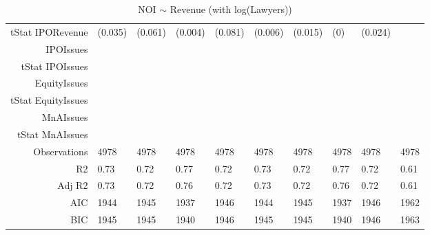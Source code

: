 \begin{table}[ht]
\begin{tabular}{rlllllllll}
  tStat IPORevenue & (0.035) & (0.061) & (0.004) & (0.081) & (0.006) & (0.015) & (0) & (0.024) &  \\ 
  IPOIssues &  &  &  &  &  &  &  &  &  \\ 
  tStat IPOIssues &  &  &  &  &  &  &  &  &  \\ 
  EquityIssues &  &  &  &  &  &  &  &  &  \\ 
  tStat EquityIssues &  &  &  &  &  &  &  &  &  \\ 
  MnAIssues &  &  &  &  &  &  &  &  &  \\ 
  tStat MnAIssues &  &  &  &  &  &  &  &  &  \\ 
  Observations & 4978 & 4978 & 4978 & 4978 & 4978 & 4978 & 4978 & 4978 & 4978 \\ 
  R2 & 0.73 & 0.72 & 0.77 & 0.72 & 0.73 & 0.72 & 0.77 & 0.72 & 0.61 \\ 
  Adj R2 & 0.73 & 0.72 & 0.76 & 0.72 & 0.73 & 0.72 & 0.76 & 0.72 & 0.61 \\ 
  AIC & 1944 & 1945 & 1937 & 1946 & 1944 & 1945 & 1937 & 1946 & 1962 \\ 
  BIC & 1945 & 1945 & 1940 & 1946 & 1945 & 1945 & 1940 & 1946 & 1963 \\ 
   \hline
\end{tabular}
\caption{NOI $\sim$ Revenue (with log(Lawyers))} 
\end{table}
